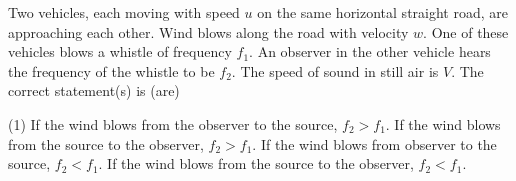 
\item Two vehicles, each moving with speed \( u \) on the same horizontal straight road, are approaching each other. Wind blows along the road with velocity \( w \). One of these vehicles blows a whistle of frequency \( f_1 \). An observer in the other vehicle hears the frequency of the whistle to be \( f_2 \). The speed of sound in still air is \( V \). The correct statement(s) is (are)
    \begin{tasks}(1)
        \task If the wind blows from the observer to the source, \( f_2 > f_1 \).
        \task If the wind blows from the source to the observer, \( f_2 > f_1 \).
        \task If the wind blows from observer to the source, \( f_2 < f_1 \).
        \task If the wind blows from the source to the observer, \( f_2 < f_1 \).
    \end{tasks}
